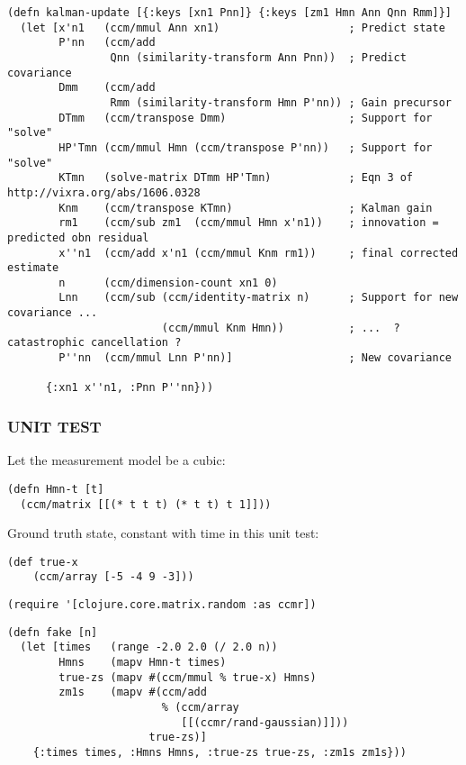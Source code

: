 \documentclass[10pt,oneside,x11names]{article}
\begin{document}
\begin{verbatim}
(defn kalman-update [{:keys [xn1 Pnn]} {:keys [zm1 Hmn Ann Qnn Rmm]}]
  (let [x'n1   (ccm/mmul Ann xn1)                    ; Predict state
        P'nn   (ccm/add
                Qnn (similarity-transform Ann Pnn))  ; Predict covariance
        Dmm    (ccm/add
                Rmm (similarity-transform Hmn P'nn)) ; Gain precursor
        DTmm   (ccm/transpose Dmm)                   ; Support for "solve"
        HP'Tmn (ccm/mmul Hmn (ccm/transpose P'nn))   ; Support for "solve"
        KTmn   (solve-matrix DTmm HP'Tmn)            ; Eqn 3 of http://vixra.org/abs/1606.0328
        Knm    (ccm/transpose KTmn)                  ; Kalman gain
        rm1    (ccm/sub zm1  (ccm/mmul Hmn x'n1))    ; innovation = predicted obn residual
        x''n1  (ccm/add x'n1 (ccm/mmul Knm rm1))     ; final corrected estimate
        n      (ccm/dimension-count xn1 0)
        Lnn    (ccm/sub (ccm/identity-matrix n)      ; Support for new covariance ...
                        (ccm/mmul Knm Hmn))          ; ...  ? catastrophic cancellation ?
        P''nn  (ccm/mmul Lnn P'nn)]                  ; New covariance

      {:xn1 x''n1, :Pnn P''nn}))
\end{verbatim}

\subsubsection{UNIT TEST}
\label{unit-test}
Let the measurement model be a cubic:

\begin{verbatim}
(defn Hmn-t [t]
  (ccm/matrix [[(* t t t) (* t t) t 1]]))
\end{verbatim}

Ground truth state, constant with time in this unit test:

\begin{verbatim}
(def true-x
    (ccm/array [-5 -4 9 -3]))
\end{verbatim}

\begin{verbatim}
(require '[clojure.core.matrix.random :as ccmr])
\end{verbatim}

\begin{verbatim}
(defn fake [n]
  (let [times   (range -2.0 2.0 (/ 2.0 n))
        Hmns    (mapv Hmn-t times)
        true-zs (mapv #(ccm/mmul % true-x) Hmns)
        zm1s    (mapv #(ccm/add
                        % (ccm/array
                           [[(ccmr/rand-gaussian)]]))
                      true-zs)]
    {:times times, :Hmns Hmns, :true-zs true-zs, :zm1s zm1s}))
\end{verbatim}
\end{document}
